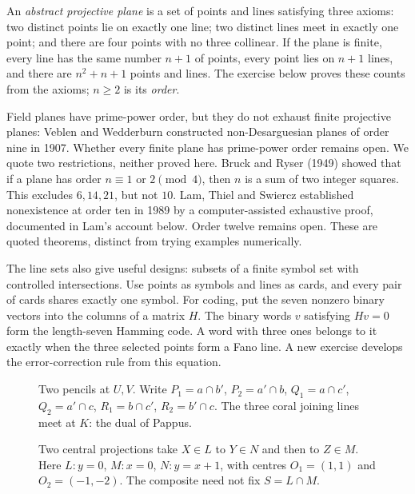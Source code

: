 An \emph{abstract projective plane} is a set of points and lines satisfying three axioms: two distinct points lie on exactly one line; two distinct lines meet in exactly one point; and there are four points with no three collinear. If the plane is finite, every line has the same number $n+1$ of points, every point lies on $n+1$ lines, and there are $n^2+n+1$ points and lines. The exercise below proves these counts from the axioms; $n\ge2$ is its \emph{order}.

\begin{remark}
Field planes have prime-power order, but they do not exhaust finite projective planes: Veblen and Wedderburn constructed non-Desarguesian planes of order nine in 1907. Whether every finite plane has prime-power order remains open. We quote two restrictions, neither proved here. Bruck and Ryser (1949) showed that if a plane has order $n\equiv1$ or $2\pmod4$, then $n$ is a sum of two integer squares. This excludes $6,14,21$, but not $10$. Lam, Thiel and Swiercz established nonexistence at order ten in 1989 by a computer-assisted exhaustive proof, documented in Lam's account below. Order twelve remains open. These are quoted theorems, distinct from trying examples numerically.
\end{remark}

The line sets also give useful designs: subsets of a finite symbol set with controlled intersections. Use points as symbols and lines as cards, and every pair of cards shares exactly one symbol. For coding, put the seven nonzero binary vectors into the columns of a matrix $H$. The binary words $v$ satisfying $Hv=0$ form the length-seven Hamming code. A word with three ones belongs to it exactly when the three selected points form a Fano line. A new exercise develops the error-correction rule from this equation.

\FloatBarrier
\begin{figure}[ht]
\centering
{}
\caption{Two pencils at $U,V$. Write $P_1=a\cap b'$, $P_2=a'\cap b$, $Q_1=a\cap c'$, $Q_2=a'\cap c$, $R_1=b\cap c'$, $R_2=b'\cap c$. The three coral joining lines meet at $K$: the dual of Pappus.}
\label{fig:v9-dual-pappus}
\end{figure}
\begin{figure}[ht]
\centering
{}
\caption{Two central projections take $X\in L$ to $Y\in N$ and then to $Z\in M$. Here $L:y=0$, $M:x=0$, $N:y=x+1$, with centres $O_1=(1,1)$ and $O_2=(-1,-2)$. The composite need not fix $S=L\cap M$.}
\label{fig:v9-two-perspectivities}
\end{figure}

